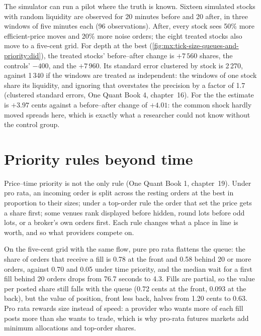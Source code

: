 The simulator can run a pilot where the truth is known. Sixteen simulated stocks with random liquidity are observed for 20 minutes before and 20 after, in
three windows of five minutes each (96 observations). After, every stock sees 50\% more efficient-price moves and 20\% more noise orders; the eight
treated stocks also move to a five-cent grid. For depth at the best (\cref{fig:mx:tick-size-queues-and-priority:did}), the treated stocks' before--after
change is $+7\,560$ shares, the controls' $-400$, and the  $+7\,960$. Its standard error clustered by stock is 2\,270, against
1\,340 if the windows are treated as independent: the windows of one stock share its liquidity, and ignoring that overstates the precision by a factor of
1.7 (clustered standard errors, One Quant Book 4, chapter~16). For the  the estimate is $+3.97$ cents against a before--after change of
$+4.01$: the common shock hardly moved spreads here, which is exactly what a researcher could not know without the control group.

\section{Priority rules beyond time}

Price--time priority is not the only rule (One Quant Book 1, chapter~19). Under pro rata, an incoming order is split across the resting orders at the best
in proportion to their sizes; under a top-order rule the order that set the price gets a share first; some venues rank displayed before hidden, round
lots before odd lots, or a broker's own orders first. Each rule changes what a place in line is worth, and so what providers compete on.

On the five-cent grid with the same flow, pure pro rata flattens the queue: the share of orders that receive a fill is 0.78 at the front and 0.58
behind 20 or more orders, against 0.70 and 0.05 under time priority, and the median wait for a first fill behind 20 orders drops from 76.7 seconds to
4.3. Fills are partial, so the value per posted share still falls with the queue (0.72 cents at the front, 0.093 at the back), but the value of position,
front less back, halves from 1.20 cents to 0.63. Pro rata rewards size instead of speed: a provider who wants more of each fill posts more than she
wants to trade, which is why pro-rata futures markets add minimum allocations and top-order shares.

